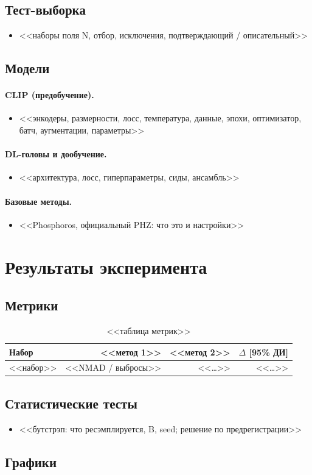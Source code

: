 \documentclass[11pt,a4paper]{article}
\begin{document}
\subsection{Тест-выборка}
\begin{itemize}
  \item <<наборы поля N, отбор, исключения, подтверждающий / описательный>>
\end{itemize}

\subsection{Модели}
\paragraph{CLIP (предобучение).}
\begin{itemize}
  \item <<энкодеры, размерности, лосс, температура, данные, эпохи, оптимизатор, батч, аугментации, параметры>>
\end{itemize}
\paragraph{DL-головы и дообучение.}
\begin{itemize}
  \item <<архитектура, лосс, гиперпараметры, сиды, ансамбль>>
\end{itemize}
\paragraph{Базовые методы.}
\begin{itemize}
  \item <<Phosphoros, официальный PHZ: что это и настройки>>
\end{itemize}

\section{Результаты эксперимента}

\subsection{Метрики}

\begin{table}[H]
\centering
\caption{<<таблица метрик>>}
\begin{tabular}{lrrr}
\toprule
Набор & <<метод 1>> & <<метод 2>> & $\Delta$ [95\% ДИ] \\
\midrule
<<набор>> & <<NMAD / выбросы>> & <<…>> & <<…>> \\
\bottomrule
\end{tabular}
\end{table}

\subsection{Статистические тесты}
\begin{itemize}
  \item <<бутстрэп: что ресэмплируется, B, seed; решение по предрегистрации>>
\end{itemize}

\subsection{Графики}
\end{document}
